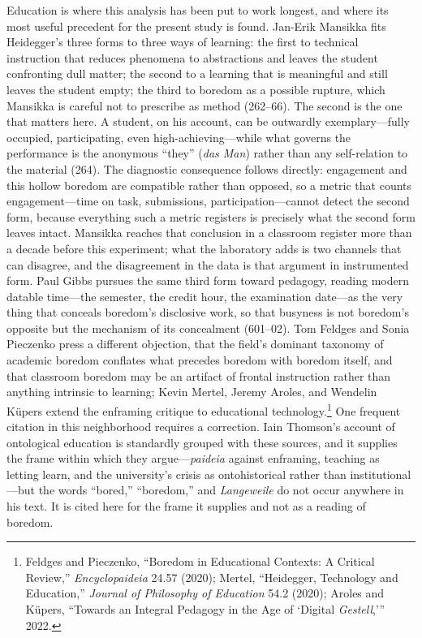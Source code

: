 Education is where this analysis has been put to work longest, and where its most useful
precedent for the present study is found. Jan-Erik Mansikka fits Heidegger's three forms to
three ways of learning: the first to technical instruction that reduces phenomena to
abstractions and leaves the student confronting dull matter; the second to a learning that is
meaningful and still leaves the student empty; the third to boredom as a possible rupture,
which Mansikka is careful not to prescribe as method (262--66). The second is the one that
matters here. A student, on his account, can be outwardly exemplary---fully occupied,
participating, even high-achieving---while what governs the performance is the anonymous
``they'' (\textit{das Man}) rather than any self-relation to the material (264). The
diagnostic consequence follows directly: engagement and this hollow boredom are compatible
rather than opposed, so a metric that counts engagement---time on task, submissions,
participation---cannot detect the second form, because everything such a metric registers is
precisely what the second form leaves intact. Mansikka reaches that conclusion in a classroom
register more than a decade before this experiment; what the laboratory adds is two channels
that can disagree, and the disagreement in the data is that argument in instrumented form.
Paul Gibbs pursues the same third form toward pedagogy, reading modern datable time---the
semester, the credit hour, the examination date---as the very thing that conceals boredom's
disclosive work, so that busyness is not boredom's opposite but the mechanism of its
concealment (601--02). Tom Feldges and Sonia Pieczenko press a different objection, that the
field's dominant taxonomy of academic boredom conflates what precedes boredom with boredom
itself, and that classroom boredom may be an artifact of frontal instruction rather than
anything intrinsic to learning; Kevin Mertel, Jeremy Aroles, and Wendelin Küpers extend the
enframing critique to educational technology.\footnote{Feldges and Pieczenko, ``Boredom in
Educational Contexts: A Critical Review,'' \textit{Encyclopaideia} 24.57 (2020); Mertel,
``Heidegger, Technology and Education,'' \textit{Journal of Philosophy of Education} 54.2
(2020); Aroles and K\"upers, ``Towards an Integral Pedagogy in the Age of `Digital
\textit{Gestell},''' 2022.} One frequent citation in this neighborhood requires a
correction. Iain Thomson's account of ontological education is standardly grouped with these
sources, and it supplies the frame within which they argue---\textit{paideia} against
enframing, teaching as letting learn, and the university's crisis as ontohistorical rather
than institutional---but the words ``bored,'' ``boredom,'' and \textit{Langeweile} do not
occur anywhere in his text. It is cited here for the frame it supplies and not as a reading
of boredom.

